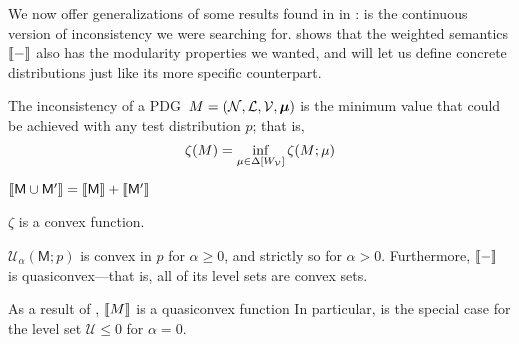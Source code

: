 \documentclass{article}
\newcommand{\commentout}[1]{\ignorespaces}
\newcommand{\bmu}{\boldsymbol{\mu}}
\newcommand{\sfM}{\mathsf M}
\newcommand{\MN}{PDG}
\numberwithin{equation}{section}
\begin{document}
{        
	We now offer generalizations of some results found in in
        :
         is the continuous version of
        inconsistency we were searching
        for.  shows that the
        weighted semantics $\llbracket-\rrbracket$ also has the modularity
        properties we wanted, and  will let us
        define concrete distributions just like its more specific
        counterpart. 
	
	\begin{defn}\label{def:cont-inconsist}
		The inconsistency of a \MN\ $M = (\cal N, L, V, \bmu)$ is the minimum value that could be achieved with any test distribution $p$; that is, 
		\[ \zeta(M) = \inf_{ \mu \in \Delta [W_{\cal V}]} \zeta (M; \mu) 
		\]		
	\end{defn}
	\begin{prop}[name=\Cref{prop:union-set-semantics} analog]\label{prop:union-weight-semantics}
		$\bbr{\sfM \cup \sfM'} = \bbr{\sfM} + \bbr{\sfM'}$
	\end{prop}
	\begin{lemma}[name=\Cref{prop:convex} analog, restate=thmzetaconvex]\label{thm:zetaconvex}
		$\zeta$ is a convex function. %
	\end{lemma}
	\begin{coro}\label{cor:u-convex}
		$\mathcal{U}_\alpha(\sfM; p)$ is convex in $p$ for $\alpha \geq 0$, and strictly so for $\alpha> 0$. Furthermore, $\llbracket-\rrbracket$ is quasiconvex---that is, all of its level sets are convex sets.
	\end{coro}

	As a result of , $\llbracket M\rrbracket$ is a quasiconvex function 
	In particular,  is the special case for the level set $\mathcal U \leq 0$ for $\alpha = 0$. 
	
}
	
\end{document}

